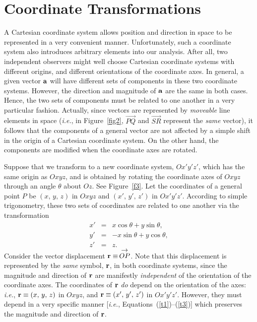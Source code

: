 \section{Coordinate Transformations}\label{stransx}
A Cartesian coordinate system allows  position and direction in space to be represented in a very convenient
manner. Unfortunately, such a coordinate system also introduces arbitrary elements into our analysis. After all, two independent observers might well choose Cartesian coordinate systems with different origins, and
different orientations of the coordinate axes. In general, a given vector ${\bf a}$ will have different
sets of components in these two coordinate systems. However, the direction and magnitude of ${\bf a}$ are the
same in both cases. Hence, the two sets of components must be related to one another in a very particular fashion.  
Actually, since vectors are represented by {\em moveable}\/ line elements in space ({\em i.e.},  in Figure~\ref{fig2},  $\stackrel{\displaystyle \rightarrow}{PQ}$ and  $\stackrel{\displaystyle \rightarrow}{SR}$ represent the {\em same}\/ vector), it follows that
the components of a general vector are not affected by a simple shift in the origin of a Cartesian coordinate system. On the other hand, the
components are modified when the coordinate axes are rotated. 

Suppose that we transform to a new coordinate system, $Ox'y'z'$, which has the
same origin as $Oxyz$, and is obtained by 
rotating the coordinate axes of $Oxyz$ through an angle
$\theta$ about  $Oz$. See Figure~\ref{f3}.
Let the coordinates of a general point $P$ be $(x,\,y,\,z)$ in $Oxyz$ and $(x',\, y',\, z')$ in $Ox'y'z'$. According to simple trigonometry, these two sets of coordinates are related to one another via the transformation 
\begin{eqnarray}
x' &=& x\cos\theta + y\sin \theta,\label{t1}\\[0.5ex]
y' &=& -x\sin\theta + y\cos\theta,\label{t2}\\[0.5ex]
z' &=& z.\label{t3}
\end{eqnarray}
Consider the vector displacement ${\bf r} \equiv\, \stackrel{\displaystyle \rightarrow}{OP}$. 
Note that this displacement is represented by the {\em same}\/ symbol, ${\bf r}$, in both
coordinate systems, since the magnitude and
direction of ${\bf r}$ are manifestly {\em independent}\/ of the orientation of the coordinate axes. The
coordinates of ${\bf r}$ {\em do}\/ depend on the orientation of the axes: {\em i.e.}, ${\bf r}\equiv (x,\,y,\,z)$ in $Oxyz$, and
${\bf r}\equiv (x',\,y',\,z')$ in $Ox'y'z'$. 
However, they must depend in a very specific manner [{\em i.e.}, Equations~(\ref{t1})--(\ref{t3})] which
preserves the magnitude and direction of ${\bf r}$.

